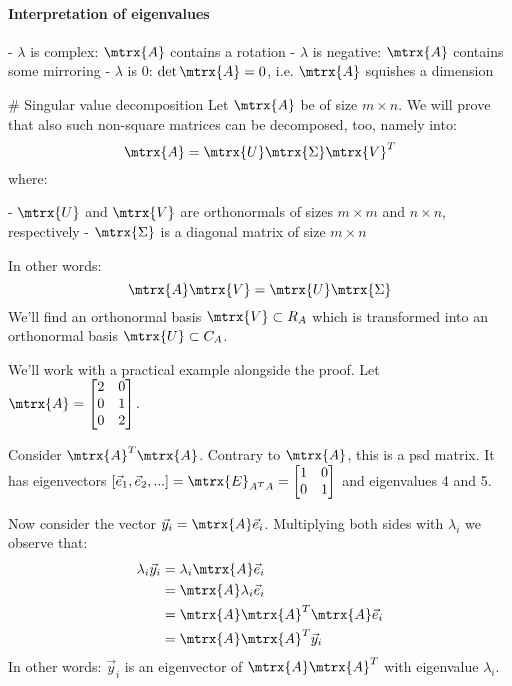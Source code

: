 \paragraph{Interpretation of eigenvalues}

    - $\lambda$ is complex: $\mtrx{A}$ contains a rotation
    - $\lambda$ is negative: $\mtrx{A}$ contains some mirroring
    - $\lambda$ is 0: $\det{\mtrx{A}} = 0$, i.e. $\mtrx{A}$ squishes a dimension





# Singular value decomposition
Let $\mtrx{A}$ be of size $m \times n$. We will prove that also such non-square matrices can be decomposed, too, namely into:
\begin{equation}
    \mtrx{A} = \mtrx{U} \mtrx{\Sigma} \mtrx{V}^T
\end{equation}
where:

    - $\mtrx{U}$ and $\mtrx{V}$ are orthonormals of sizes $m \times m$ and $n \times n$, respectively
    - $\mtrx{\Sigma}$ is a diagonal matrix of size $m \times n$

In other words: 
\begin{equation}
    \mtrx{A} \mtrx{V} = \mtrx{U} \mtrx{\Sigma}
\end{equation}
We'll find an orthonormal basis $\mtrx{V} \subset R_A$ which is transformed into an orthonormal basis $\mtrx{U} \subset C_A$.


We'll work with a practical example alongside the proof. Let $\mtrx{A} = \begin{bmatrix}
  2 & 0 \\
  0 & 1 \\
  0 & 2   
\end{bmatrix}$.

Consider $\mtrx{A}^T \mtrx{A}$. Contrary to $\mtrx{A}$, this is a psd matrix. It has eigenvectors $[\vec{e}_1, \vec{e}_2, ...] = \mtrx{E}_{A^TA} = \begin{bmatrix}
    1 & 0 \\
    0 & 1
\end{bmatrix}$ and eigenvalues 4 and 5.

Now consider the vector $\vec{y}_i = \mtrx{A} \vec{e}_i$. Multiplying both sides with $\lambda_i$ we observe that:
\begin{equation}
    \begin{aligned}
        \lambda_i \vec{y}_i &= \lambda_i \mtrx{A} \vec{e}_i \\
                            &= \mtrx{A} \lambda_i \vec{e}_i \\
                            &= \mtrx{A} \mtrx{A}^T \mtrx{A} \vec{e}_i \\
                            &= \mtrx{A} \mtrx{A}^T \vec{y}_i
    \end{aligned}
\end{equation}
In other words: $\vec{y}_i$ is an eigenvector of $\mtrx{A} \mtrx{A}^T$ with eigenvalue $\lambda_i$.

